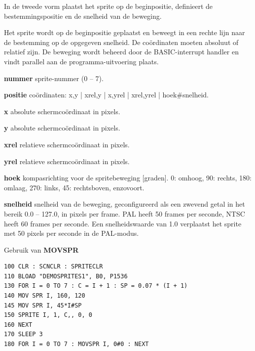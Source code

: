 \begin{description}[leftmargin=2cm,style=nextline]
                  In de tweede vorm plaatst het sprite op de beginpositie, definieert de bestemmingspositie en de snelheid van de beweging.

                  Het sprite wordt op de beginpositie geplaatst en beweegt in een rechte lijn naar de bestemming op de opgegeven snelheid. De coördinaten moeten absoluut of relatief zijn. De beweging wordt beheerd door de BASIC-interrupt handler en vindt parallel aan de programma-uitvoering plaats.

                  {\bf nummer} sprite-nummer (0 -- 7).

                  {\bf positie} coördinaten: x,y | xrel,y | x,yrel | xrel,yrel | hoek\#snelheid.

                  {\bf x} absolute schermcoördinaat in pixels.

                  {\bf y} absolute schermcoördinaat in pixels.

                  {\bf xrel} relatieve schermcoördinaat in pixels.

                  {\bf yrel} relatieve schermcoördinaat in pixels.

                  {\bf hoek} kompasrichting voor de spritebeweging [graden]. 0: omhoog, 90: rechts, 180: omlaag, 270: links, 45: rechtsboven, enzovoort.

                  {\bf snelheid} snelheid van de beweging, geconfigureerd als een zwevend getal in het bereik 0.0 -- 127.0, in pixels per frame. PAL heeft 50 frames per seconde, NTSC heeft 60 frames per seconde. Een snelheidswaarde van 1.0 verplaatst het sprite met 50 pixels per seconde in de PAL-modus.

\item [Voorbeeld:]  Gebruik van {\bf MOVSPR}

\begin{tcolorbox}[colback=black,coltext=white]
\verbatimfont{\codefont}
\begin{verbatim}
100 CLR : SCNCLR : SPRITECLR
110 BLOAD "DEMOSPRITES1", B0, P1536
130 FOR I = 0 TO 7 : C = I + 1 : SP = 0.07 * (I + 1)
140 MOV SPR I, 160, 120
145 MOV SPR I, 45*I#SP
150 SPRITE I, 1, C,, 0, 0
160 NEXT
170 SLEEP 3
180 FOR I = 0 TO 7 : MOVSPR I, 0#0 : NEXT
\end{verbatim}
\end{tcolorbox}


\end{description}


